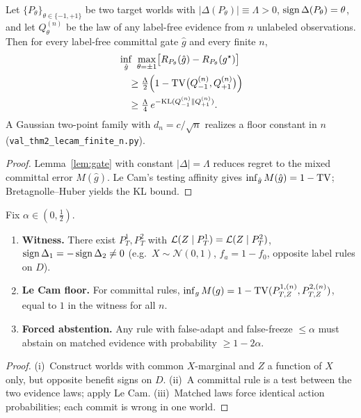 \begin{proposition}\label{prop:lecam-finite}\label{thm:imp-quant}
Let $\{P_\theta\}_{\theta\in\{-1,+1\}}$ be two target worlds with
$|\Delta(P_\theta)|\equiv\Lambda>0$, $\operatorname{sign}\Delta(P_\theta)=\theta$, and let $Q^{(n)}_\theta$
be the law of any label-free evidence from $n$ unlabeled observations. Then for every
label-free committal gate $\hat g$ and every finite $n$,
\begin{align*}
&\inf_{\hat g}\ \max_{\theta=\pm1}
  \bigl[R_{P_\theta}(\hat g)-R_{P_\theta}(g^\star)\bigr]\\
&\quad\ge \tfrac{\Lambda}{2}\Bigl(1-\mathrm{TV}\bigl(Q^{(n)}_{-1},Q^{(n)}_{+1}\bigr)\Bigr)\\
&\quad\ge \tfrac{\Lambda}{4}\,e^{-\mathrm{KL}(Q^{(n)}_{-1}\|Q^{(n)}_{+1})}.
\end{align*}
A Gaussian two-point family with $d_n=c/\sqrt n$ realizes a floor constant in $n$
(\texttt{val\_thm2\_lecam\_finite\_n.py}).
\end{proposition}
\begin{proof}
Lemma~\ref{lem:gate} with constant $|\Delta|=\Lambda$ reduces regret to the mixed committal
error $M(\hat g)$. Le Cam's testing affinity gives $\inf_{\hat g}M(\hat g)=1-\mathrm{TV}$; Bretagnolle--Huber
yields the KL bound.
\end{proof}

\begin{theorem}\label{thm:imp}\label{lem:nonid}
Fix $\alpha\in(0,\tfrac12)$.
\begin{enumerate}
\item[\textnormal{(i)}] \textbf{Witness.} There exist $P_T^1,P_T^2$ with
$\mathcal{L}(Z\mid P_T^1)=\mathcal{L}(Z\mid P_T^2)$, $\operatorname{sign}\Delta_1=-\operatorname{sign}\Delta_2\neq0$
(e.g.\ $X\sim\mathcal N(0,1)$, $f_a=1-f_0$, opposite label rules on $D$).
\item[\textnormal{(ii)}] \textbf{Le Cam floor.} For committal rules,
$\inf_g M(g)=1-\mathrm{TV}(P^{1,(n)}_{T,Z},P^{2,(n)}_{T,Z})$, equal to $1$ in the witness for all $n$.
\item[\textnormal{(iii)}] \textbf{Forced abstention.} Any rule with false-adapt and false-freeze
$\le\alpha$ must abstain on matched evidence with probability $\ge 1-2\alpha$.
\end{enumerate}
\end{theorem}
\begin{proof}
(i)~Construct worlds with common $X$-marginal and $Z$ a function of $X$ only, but opposite
benefit signs on $D$. (ii)~A committal rule is a test between the two evidence laws; apply Le Cam.
(iii)~Matched laws force identical action probabilities; each commit is wrong in one world.
\end{proof}

